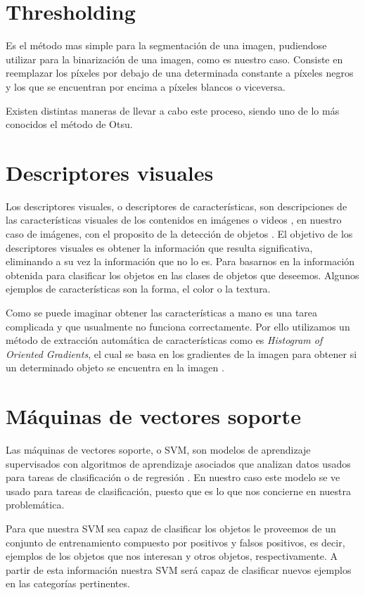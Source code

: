 \section{Thresholding}

Es el método mas simple para la segmentación de una imagen, pudiendose utilizar para la binarización de una imagen, como es nuestro caso. Consiste en reemplazar los píxeles por debajo de una determinada constante a píxeles negros y los que se encuentran por encima a píxeles blancos o viceversa.

Existen distintas maneras de llevar a cabo este proceso, siendo uno de lo más conocidos el método de Otsu. \cite{wiki:otsu}

\section{Descriptores visuales}

Los descriptores visuales, o descriptores de características, son descripciones de las características visuales de los contenidos en imágenes o videos , en nuestro caso de imágenes, con el proposito de la detección de objetos \cite{wiki:visualdescriptor}. El objetivo de los descriptores visuales es obtener la información que resulta significativa, eliminando a su vez la información que no lo es. Para basarnos en la información obtenida para clasificar los objetos en las clases de objetos que deseemos. Algunos ejemplos de características son la forma, el color o la textura.

Como se puede imaginar obtener las características a mano es una tarea complicada y que usualmente no funciona correctamente. Por ello utilizamos un método de extracción automática de características como es \textit{Histogram of Oriented Gradients}, el cual se basa en los gradientes de la imagen para obtener si un determinado objeto se encuentra en la imagen \cite{wiki:hog}.

\section{Máquinas de vectores soporte}

Las máquinas de vectores soporte, o SVM, son modelos de aprendizaje supervisados con algoritmos de aprendizaje asociados que analizan datos usados para tareas de clasificación o de regresión \cite{wiki:svm}. En nuestro caso este modelo se ve usado para tareas de clasificación, puesto que es lo que nos concierne en nuestra problemática.

Para que nuestra SVM sea capaz de clasificar los objetos le proveemos de un conjunto de entrenamiento compuesto por positivos y falsos positivos, es decir, ejemplos de los objetos que nos interesan y otros objetos, respectivamente. A partir de esta información nuestra SVM será capaz de clasificar nuevos ejemplos en las categorías pertinentes.
